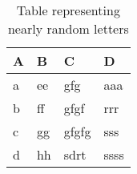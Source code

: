\begin{table}[h]
\centering
\begin{tabular}{|l|l|l|l|}
\hline
A & B  & C     & D     \\ \hline
a & ee & gfg   & aaa   \\
b & ff & gfgf  & rrr   \\
c & gg & gfgfg & sss   \\
d & hh & sdrt  & ssss  \\ \hline
\end{tabular}
\label{tab:random_letters}
\caption{Table representing nearly random letters}
\end{table}